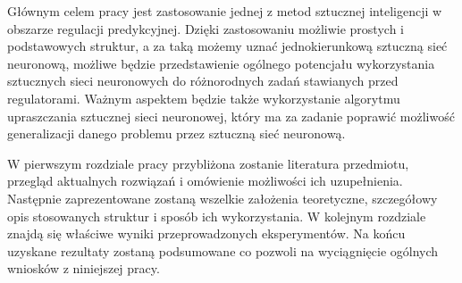 \par Głównym celem pracy jest zastosowanie jednej z metod sztucznej inteligencji w obszarze regulacji predykcyjnej. Dzięki zastosowaniu możliwie prostych i podstawowych struktur, a za taką możemy uznać jednokierunkową sztuczną sieć neuronową, możliwe będzie przedstawienie ogólnego potencjału wykorzystania sztucznych sieci neuronowych do różnorodnych zadań stawianych przed regulatorami. Ważnym aspektem będzie także wykorzystanie algorytmu upraszczania sztucznej sieci neuronowej, który ma za zadanie poprawić możliwość generalizacji danego problemu przez sztuczną sieć neuronową. 

\par W pierwszym rozdziale pracy przybliżona zostanie literatura przedmiotu, przegląd aktualnych rozwiązań i omówienie możliwości ich uzupełnienia. Następnie zaprezentowane zostaną wszelkie założenia teoretyczne, szczegółowy opis stosowanych struktur i sposób ich wykorzystania. W kolejnym rozdziale znajdą się właściwe wyniki przeprowadzonych eksperymentów. Na końcu uzyskane rezultaty zostaną podsumowane co pozwoli na wyciągnięcie ogólnych wniosków z niniejszej pracy. 




